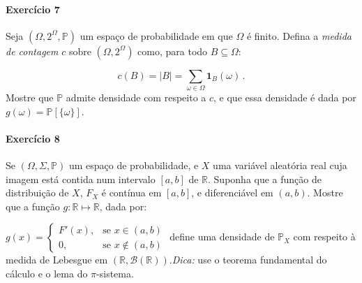 \documentclass[10pt,a4paper]{article}
\begin{document}
\paragraph{Exercício 7} Seja $(\Omega, 2^\Omega,\mathbb{P})$ um espaço de probabilidade em que $\Omega$ é finito. Defina a \emph{medida de contagem} $c$ sobre  $(\Omega, 2^\Omega)$ como, para todo $B\subseteq \Omega$:

$$c(B) = |B| = \sum_{\omega \in \Omega} \mathbf{1}_B(\omega)\, .$$
Mostre que $\mathbb{P}$ admite densidade com respeito a $c$, e que essa densidade é dada por $g(\omega) = \mathbb{P}[\{\omega\}]$.
\paragraph{Exercício 8} Se $(\Omega, \Sigma,\mathbb{P})$  um espaço de probabilidade, e $X$ uma variável aleatória real cuja imagem está contida num intervalo $[a,b]$ de $\mathbb{R}$. Suponha que a função de distribuição de $X$, $F_X$ é contínua em $[a,b]$, e diferenciável em $(a,b)$. Mostre que a função $g:\mathbb{R}\mapsto \mathbb{R}$, dada por:

$g(x) = \begin{cases}
	F'(x),&\text{se } x \in (a,b) \\
	0, & \text{se } x \notin (a,b)
\end{cases}$
define uma densidade de $\mathbb{P}_X$ com respeito à medida de Lebesgue em $(\mathbb{R},\mathcal{B}(\mathbb{R}))$.\textit{Dica:} use o teorema fundamental do cálculo e o lema do $\pi$-sistema.
\end{document}
